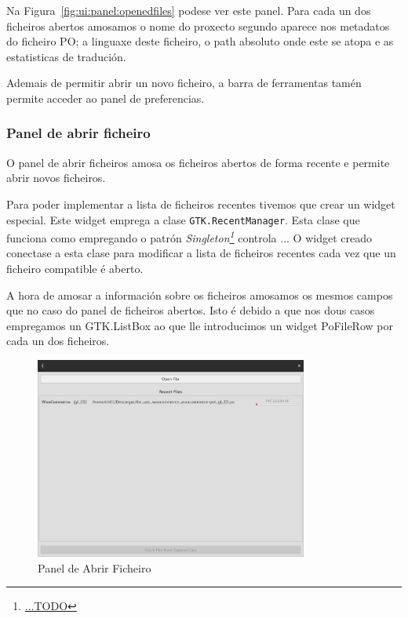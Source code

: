 Na Figura~\ref{fig:ui:panel:openedfiles} podese ver este panel. Para cada un dos ficheiros abertos amosamos o nome do proxecto segundo aparece nos metadatos do ficheiro PO; a linguaxe deste ficheiro, o path absoluto onde este se atopa e as estatisticas de tradución.

Ademais de permitir abrir un novo ficheiro, a barra de ferramentas tamén permite acceder ao panel de preferencias.

\subsubsection{Panel de abrir ficheiro}

O panel de abrir ficheiros amosa os ficheiros abertos de forma recente e permite abrir novos ficheiros.

Para poder implementar a lista de ficheiros recentes tivemos que crear un widget especial. Este widget emprega a clase \lstinline{GTK.RecentManager}. Esta clase que funciona como empregando o patrón \emph{Singleton\footnote{\href{...}{...TODO}}} controla ... O widget creado conectase a esta clase para modificar a lista de ficheiros recentes cada vez que un ficheiro compatible é aberto.

A hora de amosar a información sobre os ficheiros amosamos os mesmos campos que no caso do panel de ficheiros abertos. Isto é debido a que nos dous casos empregamos un GTK.ListBox ao que lle introducimos un widget PoFileRow por cada un dos ficheiros.

\begin{figure}[h!]
  \centering
    \includegraphics[width=0.8\textwidth]{img/panel_abrir_ficheiro.png}
    \caption{Panel de Abrir Ficheiro}
    \label{fig:ui:panel:openfile}
\end{figure}


